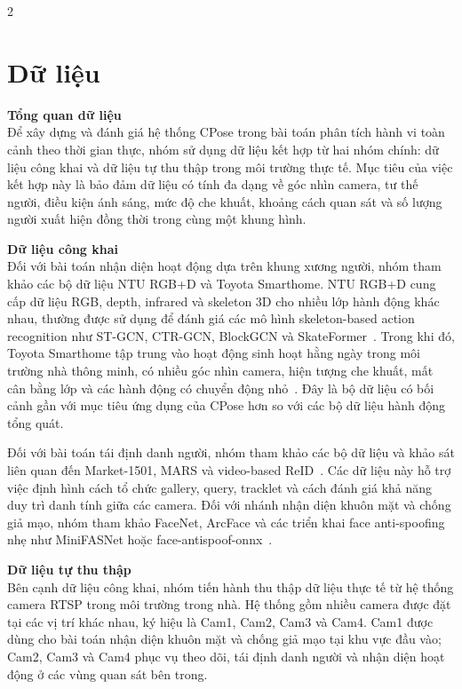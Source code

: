 \documentclass[a4paper, twoside, 12pt]{article}
\begin{document}
\begin{multicols}{2}
\section{Dữ liệu}
\vspace{-0.6cm}

\hspace*{0.5cm}\textbf{Tổng quan dữ liệu}\\
Để xây dựng và đánh giá hệ thống CPose trong bài toán phân tích hành vi toàn cảnh theo thời gian thực, nhóm sử dụng dữ liệu kết hợp từ hai nhóm chính: dữ liệu công khai và dữ liệu tự thu thập trong môi trường thực tế. Mục tiêu của việc kết hợp này là bảo đảm dữ liệu có tính đa dạng về góc nhìn camera, tư thế người, điều kiện ánh sáng, mức độ che khuất, khoảng cách quan sát và số lượng người xuất hiện đồng thời trong cùng một khung hình.


\vspace{0.1cm}
\hspace*{0.5cm}\textbf{Dữ liệu công khai}\\
Đối với bài toán nhận diện hoạt động dựa trên khung xương người, nhóm tham khảo các bộ dữ liệu NTU RGB+D và Toyota Smarthome. NTU RGB+D cung cấp dữ liệu RGB, depth, infrared và skeleton 3D cho nhiều lớp hành động khác nhau, thường được sử dụng để đánh giá các mô hình skeleton-based action recognition như ST-GCN, CTR-GCN, BlockGCN và SkateFormer~\cite{shahroudy2016ntu,yan2018stgcn,chen2021ctrgcn,zhou2024blockgcn,do2024skateformer}. Trong khi đó, Toyota Smarthome tập trung vào hoạt động sinh hoạt hằng ngày trong môi trường nhà thông minh, có nhiều góc nhìn camera, hiện tượng che khuất, mất cân bằng lớp và các hành động có chuyển động nhỏ~\cite{das2019toyota}. Đây là bộ dữ liệu có bối cảnh gần với mục tiêu ứng dụng của CPose hơn so với các bộ dữ liệu hành động tổng quát.

Đối với bài toán tái định danh người, nhóm tham khảo các bộ dữ liệu và khảo sát liên quan đến Market-1501, MARS và video-based ReID~\cite{zheng2015market1501,ye2021deep}. Các dữ liệu này hỗ trợ việc định hình cách tổ chức gallery, query, tracklet và cách đánh giá khả năng duy trì danh tính giữa các camera. Đối với nhánh nhận diện khuôn mặt và chống giả mạo, nhóm tham khảo FaceNet, ArcFace và các triển khai face anti-spoofing nhẹ như MiniFASNet hoặc face-antispoof-onnx~\cite{schroff2015facenet,deng2019arcface,liu2021minifasnet,faceantispoofonnx}.

\vspace{0.1cm}
\hspace*{0.5cm}\textbf{Dữ liệu tự thu thập}\\
Bên cạnh dữ liệu công khai, nhóm tiến hành thu thập dữ liệu thực tế từ hệ thống camera RTSP trong môi trường trong nhà. Hệ thống gồm nhiều camera được đặt tại các vị trí khác nhau, ký hiệu là Cam1, Cam2, Cam3 và Cam4. Cam1 được dùng cho bài toán nhận diện khuôn mặt và chống giả mạo tại khu vực đầu vào; Cam2, Cam3 và Cam4 phục vụ theo dõi, tái định danh người và nhận diện hoạt động ở các vùng quan sát bên trong.



\end{multicols}
\end{document}
